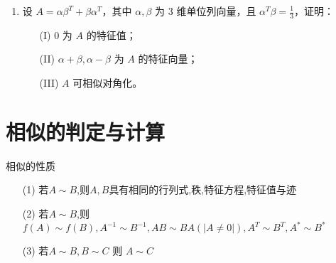 \documentclass[12pt, a4paper, oneside, UTF8]{ctexbook}
\begin{document}
\begin{enumerate}[label=\arabic*.]
    \item 设 $A = \alpha \beta^T + \beta \alpha^T$，其中 $\alpha, \beta$ 为 3 维单位列向量，且 $\alpha^T \beta = \frac{1}{3}$，证明：
    \begin{enumerate}
        \item [(I)] 0 为 $A$ 的特征值；
        \item [(II)] $\alpha + \beta, \alpha - \beta$ 为 $A$ 的特征向量；
        \item [(III)] $A$ 可相似对角化。
    \end{enumerate}
    
    \begin{solution}
    \newpage
    \end{solution}
\end{enumerate}

\section{相似的判定与计算}
\begin{remark}
    相似的性质
    \begin{enumerate}
        \item [(1)] 若$A\sim B$,则$A,B$具有相同的行列式,秩,特征方程,特征值与迹
        \item [(2)] 若$A\sim B$,则$f(A)\sim f(B),A^{-1}\sim B^{-1}, AB\sim BA(\left|A\neq 0\right|),A^{T}\sim B^{T},A^{*}\sim B^{*}$ 
        \item [(3)] 若$A\sim B, B\sim C$ 则 $A\sim C$
    \end{enumerate}
\end{remark}
\end{document}
